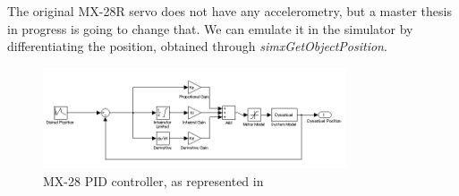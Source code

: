 The original MX-28R servo does not have any accelerometry, but a master thesis in progress is going to change that. We can emulate it in the simulator by differentiating the position, obtained through \emph{simxGetObjectPosition}. 

\begin{figure}[htp]
\center
    \includegraphics[width = 0.8\textwidth]{figures/pidcontrol}
    \caption[MX-28 PID controller]{MX-28 PID controller, as represented in \cite{mx_28_manual}}
    \label{fig:mx28_pid}
\end{figure}